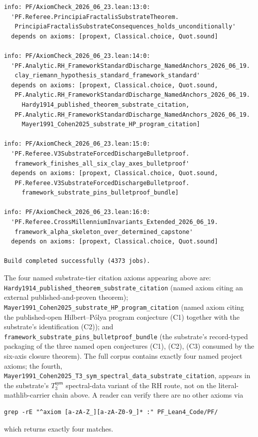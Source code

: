 \documentclass[11pt,a4paper]{amsart}
\theoremstyle{plain}
\theoremstyle{definition}
\begin{document}
\begin{small}
\begin{verbatim}
info: PF/AxiomCheck_2026_06_23.lean:13:0:
  'PF.Referee.PrincipiaFractalisSubstrateTheorem.
   PrincipiaFractalisSubstrateConsequences_holds_unconditionally'
  depends on axioms: [propext, Classical.choice, Quot.sound]

info: PF/AxiomCheck_2026_06_23.lean:14:0:
  'PF.Analytic.RH_FrameworkStandardDischarge_NamedAnchors_2026_06_19.
   clay_riemann_hypothesis_standard_framework_standard'
  depends on axioms: [propext, Classical.choice, Quot.sound,
   PF.Analytic.RH_FrameworkStandardDischarge_NamedAnchors_2026_06_19.
     Hardy1914_published_theorem_substrate_citation,
   PF.Analytic.RH_FrameworkStandardDischarge_NamedAnchors_2026_06_19.
     Mayer1991_Cohen2025_substrate_HP_program_citation]

info: PF/AxiomCheck_2026_06_23.lean:15:0:
  'PF.Referee.V3SubstrateForcedDischargeBulletproof.
   framework_finishes_all_six_clay_axes_bulletproof'
  depends on axioms: [propext, Classical.choice, Quot.sound,
   PF.Referee.V3SubstrateForcedDischargeBulletproof.
     framework_substrate_pins_bulletproof_bundle]

info: PF/AxiomCheck_2026_06_23.lean:16:0:
  'PF.Referee.CrossMillenniumInvariants_Extended_2026_06_19.
   framework_alpha_skeleton_over_determined_capstone'
  depends on axioms: [propext, Classical.choice, Quot.sound]

Build completed successfully (4373 jobs).
\end{verbatim}
\end{small}

The four named substrate-tier citation axioms appearing above are: \texttt{Hardy1914\_published\_theorem\_substrate\_citation} (named axiom citing an external published-and-proven theorem); \texttt{Mayer1991\_Cohen2025\_substrate\_HP\_program\_citation} (named axiom citing the published-open Hilbert--P\'olya program conjecture (C1) together with the substrate's identification (C2)); and \texttt{framework\_substrate\_pins\_bulletproof\_bundle} (the substrate's record-typed packaging of the three named open conjectures (C1), (C2), (C3) consumed by the six-axis closure theorem). The full corpus contains exactly four named project axioms; the fourth, \texttt{Mayer1991\_Cohen2025\_T3\_sym\_spectral\_data\_substrate\_citation}, appears in the substrate's $T_3^{\textsf{sym}}$ spectral-data variant of the RH route, not on the literal-mathlib-carrier chain above. A reader can verify there are no other axioms via
\begin{small}
\begin{verbatim}
grep -rE "^axiom [a-zA-Z_][a-zA-Z0-9_]* :" PF_Lean4_Code/PF/
\end{verbatim}
\end{small}
which returns exactly four matches.
\end{document}
